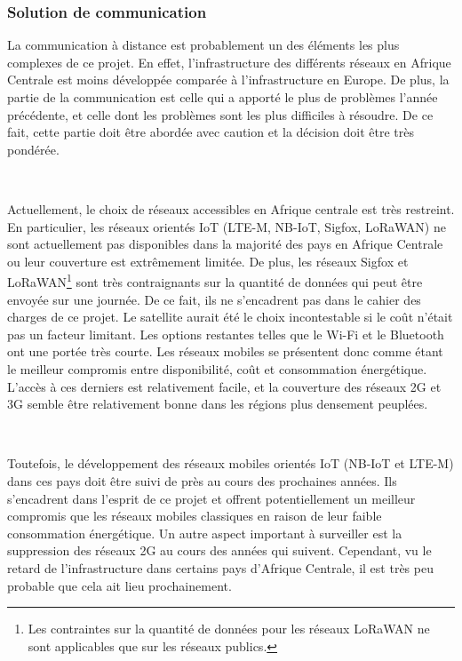 \subsubsection{Solution de communication}

\noindent
La communication à distance est probablement un des éléments les plus complexes de ce projet. En effet, l'infrastructure des différents réseaux en Afrique Centrale est moins développée comparée à l'infrastructure en Europe. De plus, la partie de la communication est celle qui a apporté le plus de problèmes l'année précédente, et celle dont les problèmes sont les plus difficiles à résoudre. De ce fait, cette partie doit être abordée avec caution et la décision doit être très pondérée.

~

\noindent
Actuellement, le choix de réseaux accessibles en Afrique centrale est très restreint. En particulier, les réseaux orientés IoT (LTE-M, NB-IoT, Sigfox, LoRaWAN) ne sont actuellement pas disponibles dans la majorité des pays en Afrique Centrale ou leur couverture est extrêmement limitée.
De plus, les réseaux Sigfox et LoRaWAN\footnote{Les contraintes sur la quantité de données pour les réseaux LoRaWAN ne sont applicables que sur les réseaux publics.} sont très contraignants sur la quantité de données qui peut être envoyée sur une journée. De ce fait, ils ne s'encadrent pas dans le cahier des charges de ce projet. Le satellite aurait été le choix incontestable si le coût n'était pas un facteur limitant. Les options restantes telles que le Wi-Fi et le Bluetooth ont une portée très courte.  Les réseaux mobiles se présentent donc comme étant le meilleur compromis entre disponibilité, coût et consommation énergétique. L'accès à ces derniers est relativement facile, et la couverture des réseaux 2G et 3G semble être relativement bonne dans les régions plus densement peuplées. \cite{coverage_airtel, coverage_orange}


~

\noindent
Toutefois, le développement des réseaux mobiles orientés IoT (NB-IoT et LTE-M) dans ces pays doit être suivi de près au cours des prochaines années. Ils s'encadrent dans l'esprit de ce projet et offrent potentiellement un meilleur compromis que les réseaux mobiles classiques en raison de leur faible consommation énergétique.  Un autre aspect important à surveiller est la suppression des réseaux 2G au cours des années qui suivent. Cependant, vu le retard de l'infrastructure dans certains pays d'Afrique Centrale, il est très peu probable que cela ait lieu prochainement.

